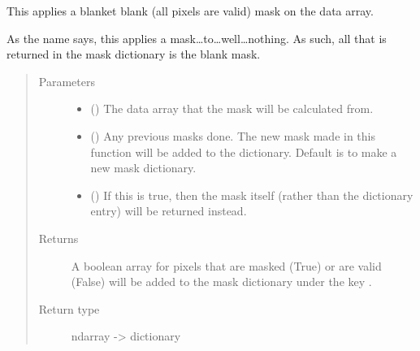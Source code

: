 \documentclass[letterpaper,10pt,english]{sphinxmanual}
\begin{document}
\begin{fulllineitems}
\label{\detokenize{python_docstrings/IfA_Smeargle.echo.masks.masks_echo300:IfA_Smeargle.echo.masks.masks_echo300.echo398_nothing}}
This applies a blanket blank (all pixels are valid) mask on the
data array.

As the name says, this applies a mask…to…well…nothing. As such,
all that is returned in the mask dictionary is the blank mask.
\begin{quote}\begin{description}
\item[{Parameters}] \leavevmode\begin{itemize}
\item {} 
 () \textendash{} The data array that the mask will be calculated from.

\item {} 
 (\sphinxstyleliteralemphasis{\sphinxupquote{ (}}\sphinxstyleliteralemphasis{\sphinxupquote{)}}) \textendash{} Any previous masks done. The new mask made in this function will be
added to the dictionary. Default is to make a new mask dictionary.

\item {} 
 (\sphinxstyleliteralemphasis{\sphinxupquote{ (}}\sphinxstyleliteralemphasis{\sphinxupquote{)}}) \textendash{} If this is true, then the mask itself (rather than the dictionary
entry) will be returned instead.

\end{itemize}

\item[{Returns}] \leavevmode
{} \textendash{} A boolean array for pixels that are masked (True) or are valid
(False) will be added to the mask dictionary under the
key .

\item[{Return type}] \leavevmode
ndarray -\textgreater{} dictionary

\end{description}\end{quote}

\end{fulllineitems}
\end{document}
